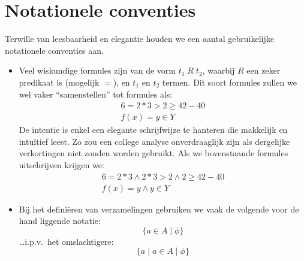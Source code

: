 \section{Notationele conventies}

Terwille van leesbaarheid en elegantie houden we een aantal gebruikelijke notationele conventies aan.

\begin{itemize}
  \item Veel wiskundige formules zijn van de vorm $t_1\; R\; t_2$, waarbij $R$ een zeker predikaat is (mogelijk $=$), en $t_1$ en $t_2$ termen. Dit soort formules zullen we wel vaker ``samenstellen'' tot formules als:
  \begin{eqnarray}
    6 = 2 * 3 > 2 \ge 42 - 40 \\
    f(x) = y \in Y
  \end{eqnarray}
  De intentie is enkel een elegante schrijfwijze te hanteren die makkelijk en intuïtief leest. Zo zou een college analyse onverdraaglijk zijn als dergelijke verkortingen niet zouden worden gebruikt. Als we bovenstaande formules uitschrijven krijgen we:
  \begin{eqnarray}
    6 = 2 * 3 \land 2 * 3 > 2 \land 2 \ge 42 - 40 \\
    f(x) = y \land y \in Y
  \end{eqnarray}
  \item Bij het definiëren van verzamelingen gebruiken we vaak de volgende voor de hand liggende notatie: $$ \{a \in A \mid \phi \} $$ \dots i.p.v.~het omslachtigere: $$ \{a \mid a \in A \mid \phi\} $$
\end{itemize}
